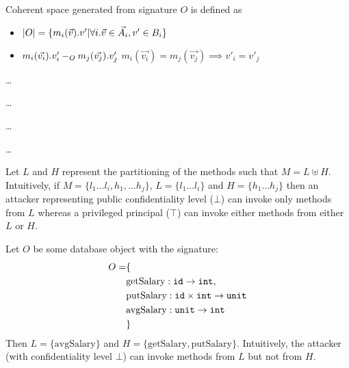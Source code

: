 \documentclass[acmsmall,screen,review, nonacm]{acmart}
\begin{document}
\begin{definition}
  Coherent space generated from signature $O$ is defined as
  \begin{itemize}
  \item $|O| = \{ m_i(\vec{v}).v' | \forall i. \vec{v} \in \vec{A_i}, v' \in B_i  \}$
    \item $ m_i(\vec{v_i}).v'_i -_{O} m_j(\vec{v_j}).v'_j$ \isdef $m_i(\vec{v_i}) = m_j(\vec{v_j}) \implies v'_i = v'_j $
  \end{itemize}
  
\end{definition}


\begin{definition}
\dots
\end{definition}

\begin{definition}
\dots

\end{definition}


\begin{definition}[Trace]
\dots

\end{definition}


\begin{definition}[Projection]
\dots

\end{definition}


Let $L$ and $H$ represent the partitioning of the methods such that $M = L \uplus H$. Intuitively, if $M = \{ l_1 \dots l_i, h_1, \dots h_j \}$,  $L = \{ l_1 \dots l_i\}$ and $H = \{ h_1 \dots h_j \}$ then an attacker representing public confidentiality level ($\bot$) can  invoke only methods from $L$ whereas a privileged principal ($\top$) can invoke either methods from either $L$ or $H$. 

\begin{example}
  Let $O$ be some database object with the signature:
  \begin{align*}
    O = & \{ \\
    & \text{getSalary}: \texttt{id} \to \texttt{int}, \\
    & \text{putSalary}: \texttt{id} \times \texttt{int} \to \texttt{unit} \\
    & \text{avgSalary}: \texttt{unit} \to \texttt{int} \\
    & \}
  \end{align*}
  Then $L = \{ \text{avgSalary} \}$ and $H = \{\text{getSalary}, \text{putSalary} \}$. Intuitively, the  attacker (with confidentiality level $\bot$) can  invoke  methods from $L$ but not from $H$.
  \end{example}
\end{document}
